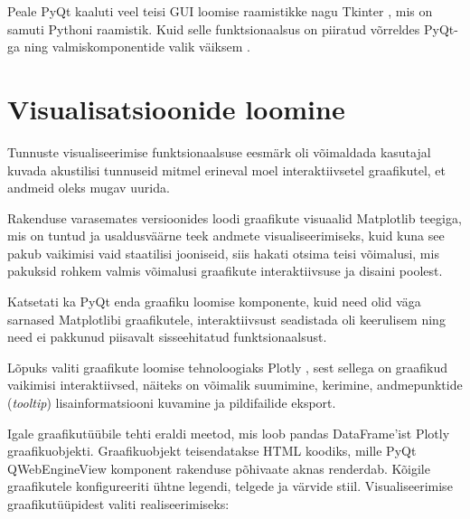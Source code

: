 Peale PyQt kaaluti veel teisi GUI loomise raamistikke nagu Tkinter \cite{tkinter}, mis on samuti Pythoni raamistik. Kuid selle funktsionaalsus on piiratud võrreldes PyQt-ga ning valmiskomponentide valik väiksem \cite{pyqt_tkinter}.

\section{Visualisatsioonide loomine}

Tunnuste visualiseerimise funktsionaalsuse eesmärk oli võimaldada kasutajal kuvada akustilisi tunnuseid mitmel erineval moel interaktiivsetel graafikutel, et andmeid oleks mugav uurida.

Rakenduse varasemates versioonides loodi graafikute visuaalid Matplotlib \cite{matplotlib} teegiga, mis on tuntud ja usaldusväärne teek andmete visualiseerimiseks, kuid kuna see pakub vaikimisi vaid staatilisi jooniseid, siis hakati otsima teisi võimalusi, mis pakuksid rohkem valmis võimalusi graafikute interaktiivsuse ja disaini poolest. 

 Katsetati ka PyQt enda graafiku loomise komponente, kuid need olid väga sarnased Matplotlibi graafikutele, interaktiivsust seadistada oli keerulisem ning need ei pakkunud piisavalt sisseehitatud funktsionaalsust.

Lõpuks valiti graafikute loomise tehnoloogiaks Plotly \cite{plotly}, sest sellega on graafikud vaikimisi interaktiivsed, näiteks on võimalik suumimine, kerimine, andmepunktide (\textit{tooltip}) lisainformatsiooni kuvamine ja pildifailide eksport.

Igale graafikutüübile tehti eraldi meetod, mis loob pandas DataFrame'ist Plotly graafikuobjekti. Graafikuobjekt teisendatakse HTML koodiks, mille PyQt QWebEngineView komponent rakenduse põhivaate aknas renderdab. Kõigile graafikutele konfigureeriti ühtne legendi, telgede ja värvide stiil. Visualiseerimise graafikutüüpidest valiti realiseerimiseks:

